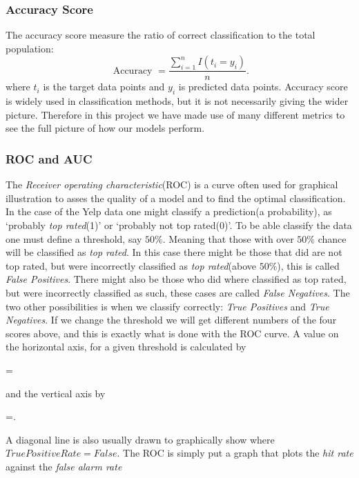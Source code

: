 \subsubsection{Accuracy Score} \label{accuracy}
The accuracy score measure the ratio of correct classification to the total population:
\begin{equation}
    \text { Accuracy }=\frac{\sum_{i=1}^{n} I\left(t_{i}=y_{i}\right)}{n}.
\end{equation}
where $t_i$ is the target data points and $y_i$ is predicted data points. Accuracy score is widely used in classification methods, but it is not necessarily giving the wider picture. Therefore in this project we have made use of many different metrics to see the full picture of how our models perform.  

\subsubsection{ROC and AUC}\label{ROC and AUC}
The \textit{Receiver operating characteristic}(ROC)\cite{Project2} is a curve often used for graphical illustration to asses the quality of a model and to find the optimal classification. In the case of the Yelp data one might classify a prediction(a probability), as `probably \textit{top rated}(1)' or `probably not top rated(0)'. To be able classify the data one must define a threshold, say $50\%$. Meaning that those with over $50\%$ chance will be classified as \textit{top rated}. In this case there might be those that did are not top rated, but were incorrectly classified as \textit{top rated}(above $50\%$), this is called \textit{False Positives}. There might also be those who did where classified as top rated, but were incorrectly classified as such, these cases are called \textit{False Negatives}. The two other possibilities is when we classify correctly: \textit{True Positives} and \textit{True Negatives}. If we change the threshold we will get different numbers of the four scores above, and this is exactly what is done with the ROC curve. A value on the horizontal axis, for a given threshold is calculated by
\begin{gather+}[0.9]
     =
\end{gather+}
and the vertical axis by
\begin{gather+}[0.9]
=.
\end{gather+}
A diagonal line is also usually drawn to graphically show where $True Positive Rate = False$.
The ROC is simply put a graph that plots the \textit{hit rate} against the \textit{false alarm rate}

